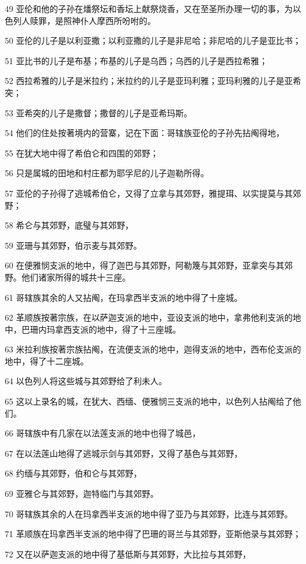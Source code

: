 \par 49 亚伦和他的子孙在燔祭坛和香坛上献祭烧香，又在至圣所办理一切的事，为以色列人赎罪，是照神仆人摩西所吩咐的。
\par 50 亚伦的儿子是以利亚撒；以利亚撒的儿子是非尼哈；非尼哈的儿子是亚比书；
\par 51 亚比书的儿子是布基；布基的儿子是乌西；乌西的儿子是西拉希雅；
\par 52 西拉希雅的儿子是米拉约；米拉约的儿子是亚玛利雅；亚玛利雅的儿子是亚希突；
\par 53 亚希突的儿子是撒督；撒督的儿子是亚希玛斯。
\par 54 他们的住处按著境内的营寨，记在下面：哥辖族亚伦的子孙先拈阄得地，
\par 55 在犹大地中得了希伯仑和四围的郊野；
\par 56 只是属城的田地和村庄都为耶孚尼的儿子迦勒所得。
\par 57 亚伦的子孙得了逃城希伯仑，又得了立拿与其郊野，雅提珥、以实提莫与其郊野；
\par 58 希仑与其郊野，底璧与其郊野，
\par 59 亚珊与其郊野，伯示麦与其郊野。
\par 60 在便雅悯支派的地中，得了迦巴与其郊野，阿勒篾与其郊野，亚拿突与其郊野。他们诸家所得的城共十三座。
\par 61 哥辖族其余的人又拈阄，在玛拿西半支派的地中得了十座城。
\par 62 革顺族按著宗族，在以萨迦支派的地中，亚设支派的地中，拿弗他利支派的地中，巴珊内玛拿西支派的地中，得了十三座城。
\par 63 米拉利族按著宗族拈阄，在流便支派的地中，迦得支派的地中，西布伦支派的地中，得了十二座城。
\par 64 以色列人将这些城与其郊野给了利未人。
\par 65 这以上录名的城，在犹大、西缅、便雅悯三支派的地中，以色列人拈阄给了他们。
\par 66 哥辖族中有几家在以法莲支派的地中也得了城邑，
\par 67 在以法莲山地得了逃城示剑与其郊野，又得了基色与其郊野，
\par 68 约缅与其郊野，伯和仑与其郊野，
\par 69 亚雅仑与其郊野，迦特临门与其郊野。
\par 70 哥辖族其余的人在玛拿西半支派的地中得了亚乃与其郊野，比连与其郊野。
\par 71 革顺族在玛拿西半支派的地中得了巴珊的哥兰与其郊野，亚斯他录与其郊野；
\par 72 又在以萨迦支派的地中得了基低斯与其郊野，大比拉与其郊野，
